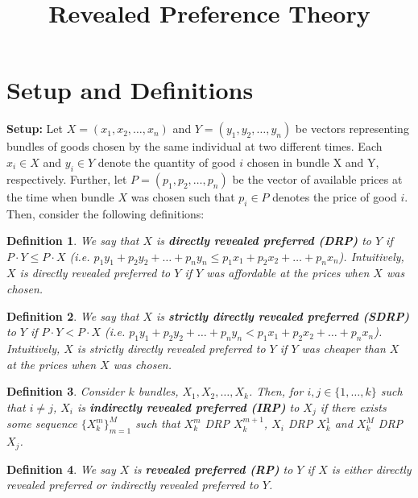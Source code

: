 \documentclass{article} %
\title{Revealed Preference Theory}
\newtheorem{definition}{Definition} %
\begin{document}
\maketitle

\section{Setup and Definitions}

\textbf{Setup:}
Let $X=(x_{1}, x_{2}, \ldots, x_{n})$ and $Y=(y_{1}, y_{2}, \ldots, y_{n})$ be vectors representing bundles of goods chosen by the same individual at two different times. Each $x_{i}\in X$ and $y_{i}\in Y$ denote the quantity of good $i$ chosen in bundle X and Y, respectively. Further, let $P=(p_{1}, p_{2}, \ldots, p_{n})$ be the vector of available prices at the time when bundle $X$ was chosen such that $p_{i}\in P$ denotes the price of good $i$. Then, consider the following definitions:

\begin{definition}
We say that $X$ is \textbf{directly revealed preferred (DRP)} to $Y$ if $P\cdot Y \leq P\cdot X$ (i.e. $p_{1}y_{1}+p_{2}y_{2}+\ldots+p_{n}y_{n}\leq p_{1}x_{1}+p_{2}x_{2}+\ldots+p_{n}x_{n}$). Intuitively, $X$ is directly revealed preferred to $Y$ if $Y$ was affordable at the prices when $X$ was chosen.
\end{definition}

\begin{definition}
We say that $X$ is \textbf{strictly directly revealed preferred (SDRP)} to $Y$ if $P\cdot Y < P\cdot X$ (i.e. $p_{1}y_{1}+p_{2}y_{2}+\ldots+p_{n}y_{n}<p_{1}x_{1}+p_{2}x_{2}+\ldots+p_{n}x_{n}$). Intuitively, $X$ is strictly directly revealed preferred to $Y$ if $Y$ was cheaper than $X$ at the prices when $X$ was chosen.
\end{definition}

\begin{definition}
Consider $k$ bundles, $X_1, X_2, \ldots, X_k$. Then, for $i,j\in\{1,\ldots,k\}$ such that $i\not=j$, $X_i$ is \textbf{indirectly revealed preferred (IRP)} to $X_j$ if there exists some sequence $\{X^m_k\}_{m=1}^{M}$ such that $X^m_k$ DRP $X^{m+1}_k$, $X_i$ DRP $X^1_k$ and $X^M_k$ DRP $X_j$.
\end{definition}

\begin{definition}
We say $X$ is \textbf{revealed preferred (RP)} to $Y$ if $X$ is either directly revealed preferred or indirectly revealed preferred to $Y$.
\end{definition}
\end{document}
